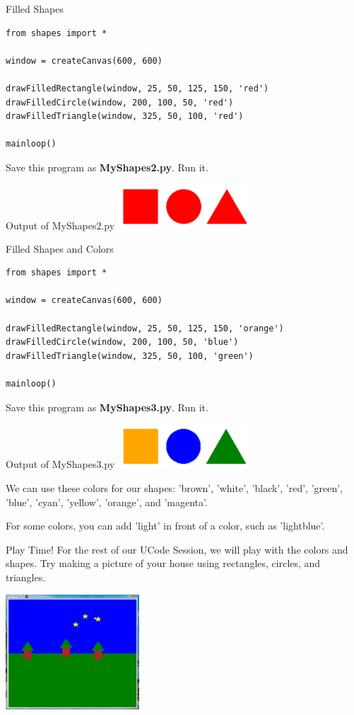 \documentclass{beamer}
\begin{document}
\begin{frame}[fragile]{Filled Shapes}

\begin{verbatim}
from shapes import *

window = createCanvas(600, 600)

drawFilledRectangle(window, 25, 50, 125, 150, 'red')
drawFilledCircle(window, 200, 100, 50, 'red')
drawFilledTriangle(window, 325, 50, 100, 'red')

mainloop()
\end{verbatim}


Save this program as \textbf{MyShapes2.py}. Run it.

\end{frame}

\begin{frame}{Output of MyShapes2.py}
\includegraphics[width=50mm]{images/squareCircleTriangleFilled.png}
\end{frame}

\begin{frame}[fragile]{Filled Shapes and Colors}

\begin{verbatim}
from shapes import *

window = createCanvas(600, 600)

drawFilledRectangle(window, 25, 50, 125, 150, 'orange')
drawFilledCircle(window, 200, 100, 50, 'blue')
drawFilledTriangle(window, 325, 50, 100, 'green')

mainloop()
\end{verbatim}

Save this program as \textbf{MyShapes3.py}. Run it.

\end{frame}

\begin{frame}{Output of MyShapes3.py}
\includegraphics[width=50mm]{images/squareCircleTriangleColors.png}

We can use these colors for our shapes: 'brown', 'white', 'black', 'red',
'green', 'blue', 'cyan', 'yellow', 'orange', and 'magenta'.

For some colors, you can add 'light' in front of a color, such as 'lightblue'.
\end{frame}

\begin{frame}{Play Time!}
For the rest of our UCode Session, we will play with the colors and shapes. Try making a picture of your house using rectangles, circles, and triangles.

\includegraphics[width=50mm]{images/scene.png}
\end{frame}
\end{document}
